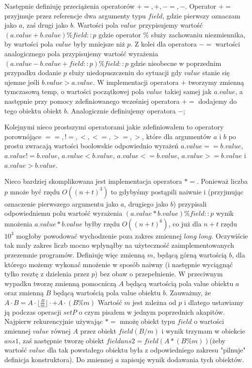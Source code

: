 \documentclass{article}
\begin{document}
Następnie definiuję przeciążenia operatorów $+=,+,-=,-$. Operator
$+=$ przyjmuje przez referencje dwa argumenty typu $field$,
gdzie pierwszy oznaczam jako $a$, zaś drugi jako $b$. Wartości pola
$value$ przypisujemy wartość $( a.value + b.value ) \%field::p$ gdzie 
operator $\%$ służy zachowaniu niezmiennika, by wartości pola $value$
były mniejsze niż $p$. Z kolei dla operatora $-=$ wartości analogicznego
pola przypisujemy wartość wyrażenia $(a.value-b.value+field::p)\%field::p$
gdzie nieobecne w poprzednim przypadku dodanie $p$ służy niedopuszczeniu
do sytuacji gdy $value$ stanie się ujemne jeśli $b.value > a.value$.
W implementacji operatora $+$ tworzymy zmienną tymczasową temp, o wartości
początkowej pola $value$ takiej samej jak $a.value$, a następnie
przy pomocy zdefiniowanego wcześniej operatora $+=$ dodajemy do tego obiektu
obiekt $b$. Analogicznie definiujemy operatora $-$;

Kolejnymi nieco prostszymi operatorami jakie zdefiniowałem to operatory porownójące
$==,!=,<,<=,>=,>$, które dla argumentów $a$ i $b$ po prostu zwracają wartości boolowskie odpowiednio 
wyrażeń $a.value == b.value$, $a.value != b.value$, $a.value < b.value$, 
$a.value <= b.value$, $a.value >= b.value$ i $a.value > b.value$.

Nieco bardziej skomplikowana jest implementacja operatora $*=$. Ponieważ liczba 
$p$ mnoże być rzędu $O((n+t)^3)$ to gdybyśmy postąpili naiwnie i (przyjmując 
oznaczenie pierwszego argumentu jako $a$, drugiego jako $b$) przypisali odpowiedniemu
polu wartość wyrażenia $(a.value*b.value)\%field::p$ wynik mnożenia $a.value*b.value$
byłby rzędu $O((n+t)^6)$, co już dla $n+t$ rzędu $10^3$ mogłoby powodować wychodzenie poza zakres 
zmiennej $long$ $long$. Oczywiście tak mały zakres liczb mocno wpłynąłby na użyteczność
zaimplementowanych przezemnie programów. Definiuję więc zmienną $m$, będącą 
górną wartością $b$, dla którego możemy wykonać mnożenie w sposób naiwny (i następnie 
wyciągnąć tylko resztę z dzielenia przez $p$) bez obaw o przepełnienie. W 
przeciwnym wypadku tworzę zmienną pomocniczą $A$ będącą wartością pola value
obiektu $a$ oraz zmienną $B$ będącą wartością pola value obiektu $b$.
Zauważmy, że $A \cdot B = A \cdot \lfloor \frac{B}{m} \rfloor \cdot  + A \cdot (B \% m)$
Wartość $m$ jest zależna od $p$ i dlatego ustawiamy ją podczas operacji $setP$ o czym pisałem w 
jednym poprzednich akapitów. Najpierw rekurencyjnie używając $*=$ mnożę
obiekt typu $field$ o wartości zmiennej $value$ równej $A$ przez obiekt $field(B/m)$ i wynik 
trzymam w obiekcie $ans1$, zaś następnie tworzę obiekt $field ans2 = field(A*(B\%m))$(żeby 
wartość $value$ dla tak powstałego obiektu była z odpowiedniego zakresu "pilnuje" definicja konstruktora).
Do zmiennej $a$ zapisuję wynik dodawania tych obiektów.
\end{document}
